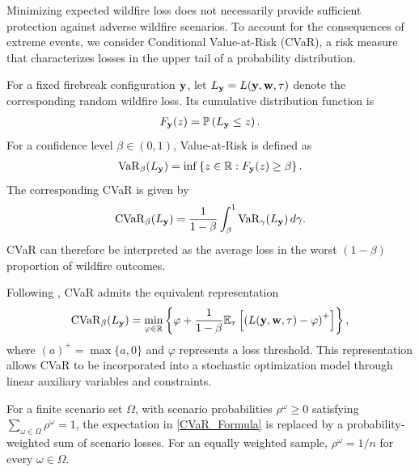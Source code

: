 \documentclass{itor}
\begin{document}
Minimizing expected wildfire loss does not necessarily
provide sufficient protection against adverse wildfire
scenarios. To account for the consequences of extreme
events, we consider Conditional Value-at-Risk (CVaR),
a risk measure that characterizes losses in the upper
tail of a probability distribution.

For a fixed firebreak configuration $\vb{y}$,
let $L_{\vb{y}}=L(\vb{y},\vb{w},\tau)$ denote
the corresponding random wildfire loss.
Its cumulative distribution function is
%
\begin{align}
F_{\vb{y}}(z)
=
\mathbb{P}
\left(
L_{\vb{y}}\leq z
\right).
\end{align}
%
For a confidence level $\beta\in(0,1)$,
Value-at-Risk is defined as
%
\begin{align}
\operatorname{VaR}_{\beta}(L_{\vb{y}})
=
\inf\left\{
z\in\mathbb{R}:
F_{\vb{y}}(z)\geq\beta
\right\}.
\end{align}
%
The corresponding CVaR is given by
%
\begin{align}
\operatorname{CVaR}_{\beta}(L_{\vb{y}})
=
\frac{1}{1-\beta}
\int_{\beta}^{1}
\operatorname{VaR}_{\gamma}(L_{\vb{y}})
\,d\gamma.
\end{align}
%
CVaR can therefore be interpreted as the average
loss in the worst $(1-\beta)$ proportion of
wildfire outcomes.

Following \citet{rockafellar2000optimization},
CVaR admits the equivalent representation
%
\begin{equation}
\label{CVaR_Formula}
\operatorname{CVaR}_{\beta}(L_{\vb{y}})
=
\min_{\varphi\in\mathbb{R}}
\left\{
\varphi+
\frac{1}{1-\beta}
\mathbb{E}_{\tau}
\left[
\left(
L(\vb{y},\vb{w},\tau)-\varphi
\right)^+
\right]
\right\},
\end{equation}
%
where $(a)^+=\max\{a,0\}$ and $\varphi$
represents a loss threshold. This representation
allows CVaR to be incorporated into a stochastic
optimization model through linear auxiliary
variables and constraints.

For a finite scenario set $\Omega$, with
scenario probabilities $\rho^\omega\geq 0$
satisfying
$\sum_{\omega\in\Omega}\rho^\omega=1$,
the expectation in
\eqref{CVaR_Formula} is replaced by a
probability-weighted sum of scenario losses.
For an equally weighted sample,
$\rho^\omega=1/n$ for every
$\omega\in\Omega$.


\end{document}
